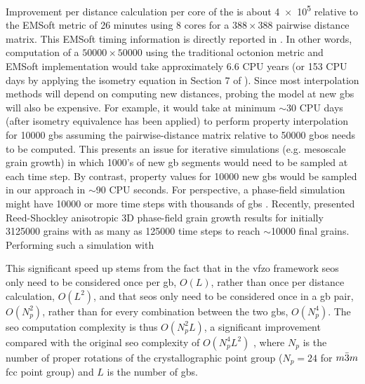 \documentclass[final,twocolumn,12pt]{elsarticle}
\begin{document}
Improvement per distance calculation per core of the \vfzorepo{} is about \num{4e5} relative to the EMSoft \cite{degraefEMSoft2020} metric of 26 minutes using 8 cores for a $\num{388}\times\num{388}$ pairwise distance matrix. This EMSoft timing information is directly reported in \citet{chesserLearningGrainBoundary2020}. In other words, computation of a $\num{50000}\times\num{50000}$ using the traditional octonion metric and EMSoft implementation would take approximately 6.6 CPU years (or 153 CPU days by applying the isometry equation in Section 7 of \citet{morawiecDistancesGrainInterfaces2019}). Since most interpolation methods will depend on computing new distances, probing the model at new \glspl{gb} will also be expensive. For example, it would take at minimum $\sim$30 CPU days (after isometry equivalence has been applied) to perform property interpolation for \num{10000} \outpt{} \glspl{gb} assuming the pairwise-distance matrix relative to \num{50000} \inpt{} \glspl{gbo} needs to be computed. This presents an issue for iterative simulations (e.g. mesoscale grain growth) in which \num{1000}'s of new \gls{gb} segments would need to be sampled at each time step. By contrast, property values for \num{10000} new \glspl{gb} would be sampled in our approach in $\sim$\num{90} CPU seconds. For perspective, a phase-field simulation might have \num{10000} or more time steps with thousands of \glspl{gb} \citet{kimPhasefieldModeling3D2014,dimokratiSPFMModelIdeal2020}.  Recently, \citet{miyoshiLargescalePhasefieldStudy2021} presented Reed-Shockley anisotropic 3D phase-field grain growth results for initially \num{3125000} grains with as many as \num{125000} time steps to reach $\sim$\num{10000} final grains. Performing such a simulation with  %

This significant speed up stems from the fact that in the \gls{vfzo} framework \glspl{seo} only need to be considered once per \gls{gb}, $O(L)$, rather than once per distance calculation, $O(L^2)$,
and that \glspl{seo} only need to be considered once in a \gls{gb} pair, $O(N_p^2)$, rather than for every combination between the two \glspl{gb}, $O(N_p^4)$. The \gls{seo} computation complexity is thus $O(N_p^2L)$, a significant improvement compared with the original \gls{seo} complexity of $O(N_p^4L^2)$ \cite{chesserLearningGrainBoundary2020}, where $N_p$ is the number of proper rotations of the crystallographic point group ($N_p=24$ for $m\Bar{3}m$ \gls{fcc} point group) and $L$ is the number of \glspl{gb}.
\end{document}
